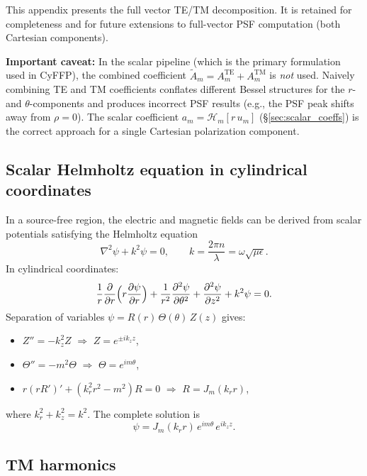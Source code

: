 \documentclass[11pt,a4paper]{article}
\newcommand{\HT}{\mathcal{H}}
\begin{document}
This appendix presents the full vector TE/TM decomposition.  It is retained
for completeness and for future extensions to full-vector PSF computation
(both Cartesian components).

\textbf{Important caveat:} In the scalar pipeline (which is the primary
formulation used in CyFFP), the combined coefficient
$\tilde A_m = A^{\mathrm{TE}}_m + A^{\mathrm{TM}}_m$ is \emph{not} used.
Naively combining TE and TM coefficients conflates different Bessel structures
for the $r$- and $\theta$-components and produces incorrect PSF results (e.g.,
the PSF peak shifts away from $\rho = 0$).  The scalar coefficient
$a_m = \HT_m[r\,u_m]$ (\S\ref{sec:scalar_coeffs}) is the correct approach
for a single Cartesian polarization component.

\subsection{Scalar Helmholtz equation in cylindrical coordinates}

In a source-free region, the electric and magnetic fields can be derived from
scalar potentials satisfying the Helmholtz equation
\begin{equation}\label{eq:helmholtz}
  \nabla^2\psi + k^2\psi = 0,\qquad k = \frac{2\pi n}{\lambda} = \omega\sqrt{\mu\epsilon}.
\end{equation}
In cylindrical coordinates:
\begin{equation}
  \frac{1}{r}\frac{\partial}{\partial r}\Bigl(r\frac{\partial\psi}{\partial r}\Bigr)
  + \frac{1}{r^2}\frac{\partial^2\psi}{\partial\theta^2}
  + \frac{\partial^2\psi}{\partial z^2}
  + k^2\psi = 0.
\end{equation}
Separation of variables $\psi = R(r)\,\Theta(\theta)\,Z(z)$ gives:
\begin{itemize}[nosep]
  \item $Z'' = -k_z^2 Z$ \;$\Rightarrow$\; $Z = e^{\pm ik_z z}$,
  \item $\Theta'' = -m^2\Theta$ \;$\Rightarrow$\; $\Theta = e^{im\theta}$,
  \item $r(rR')' + (k_r^2 r^2 - m^2)R = 0$ \;$\Rightarrow$\; $R = J_m(k_r r)$,
\end{itemize}
where $k_r^2 + k_z^2 = k^2$.  The complete solution is
\begin{equation}\label{eq:psi}
  \psi = J_m(k_r r)\,e^{im\theta}\,e^{ik_z z}.
\end{equation}


\subsection{TM harmonics}
\end{document}
